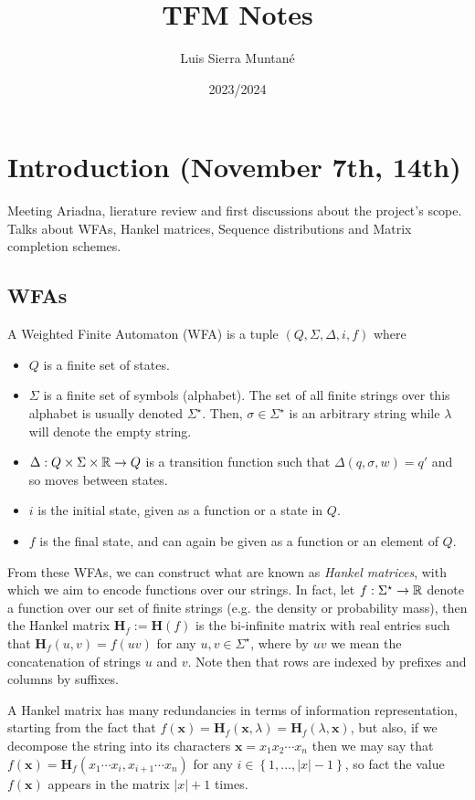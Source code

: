 \documentclass[12pt]{article}
\title{TFM Notes}
\author{Luis Sierra Muntané}
\date{2023/2024}
\begin{document}
\tableofcontents
\newpage

\section{Introduction (November 7th, 14th)}

Meeting Ariadna, lierature review and first discussions about the project's scope. Talks about WFAs, Hankel matrices, Sequence distributions and Matrix completion schemes.

\subsection{WFAs}

\begin{definition}
    A Weighted Finite Automaton (WFA) is a tuple $\left(Q, \Sigma,\Delta, i, f\right)$ where
    \begin{itemize}
        \item $Q$ is a finite set of states.
        \item $\Sigma$ is a finite set of symbols (alphabet). The set of all finite strings over this alphabet is usually denoted $\Sigma^\star$. Then, $\sigma\in\Sigma^\star$ is an arbitrary string while $\lambda$ will denote the empty string.
        \item $\Delta: Q\times \Sigma \times \mathbb{R} \rightarrow Q$ is a transition function such that $\Delta(q, \sigma, w) = q'$ and so moves between states.
        \item $i$ is the initial state, given as a function or a state in $Q$.
        \item $f$ is the final state, and can again be given as a function or an element of $Q$.
    \end{itemize}
\end{definition}

\noindent From these WFAs, we can construct what are known as \emph{Hankel matrices}, with which we aim to encode functions over our strings. In fact, let $f:\Sigma^{\star}\rightarrow \mathbb{R}$ denote a function over our set of finite strings (e.g. the density or probability mass), then the Hankel matrix $\mathbf{H}_f := \mathbf{H}(f)$ is the bi-infinite matrix with real entries such that $\mathbf{H}_f(u,v) = f(uv)$ for any $u,v\in\Sigma^{\star}$, where by $uv$ we mean the concatenation of strings $u$ and $v$. Note then that rows are indexed by prefixes and columns by suffixes.

\begin{obs}
    A Hankel matrix has many redundancies in terms of information representation, starting from the fact that $f(\mathbf{x}) = \mathbf{H}_f(\mathbf{x},\lambda) = \mathbf{H}_f(\lambda, \mathbf{x})$, but also, if we decompose the string into its characters $\mathbf{x} = x_1x_2\cdots x_n$ then we may say that $f(\mathbf{x}) = \mathbf{H}_f(x_1\cdots x_i,x_{i+1}\cdots x_n)$ for any $i\in\left\{1,\dots,\left|x\right|-1\right\}$, so fact the value $f(\mathbf{x})$ appears in the matrix $\left|x\right| + 1$ times.
\end{obs}
\end{document}
